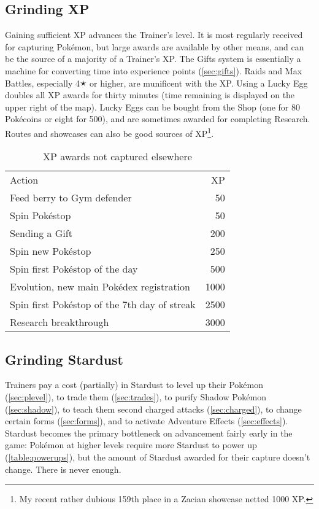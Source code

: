 \subsection{Grinding XP\label{subsec:getxp}}
Gaining sufficient XP advances the Trainer's level.
It is most regularly received for capturing Pokémon, but large awards are
  available by other means, and can be the source of a majority of a Trainer's XP.
The Gifts system is essentially a machine for converting
  time into experience points (\autoref{sec:gifts}).
Raids and Max Battles, especially 4🟉 or higher, are munificent with the XP.
Using a Lucky Egg doubles all XP awards for thirty minutes (time remaining is displayed on the upper right of the map).
Lucky Eggs can be bought from the Shop (one for 80 Pokécoins or eight for 500),
  and are sometimes awarded for completing Research.
Routes and showcases can also be good sources of XP\footnote{My recent rather dubious 159th place in a Zacian showcase netted 1000 XP\@.}.

\begin{table}
\centering
\begin{tabular}{lr}
Action & XP\\
\Midrule
  Feed berry to Gym defender & 50\\
  Spin Pokéstop & 50\\
  Sending a Gift & 200\\
  Spin new Pokéstop & 250\\
  Spin first Pokéstop of the day & 500\\
  Evolution, new main Pokédex registration & 1000\\
  Spin first Pokéstop of the 7th day of streak & 2500\\
  Research breakthrough & 3000\\
\end{tabular}
\caption{XP awards not captured elsewhere\label{table:xpawards}}
\end{table}

\subsection{Grinding Stardust\label{subsec:getdust}}
Trainers pay a cost (partially) in Stardust
  to level up their Pokémon (\autoref{sec:plevel}),
  to trade them (\autoref{sec:trades}),
  to purify Shadow Pokémon (\autoref{sec:shadow}),
  to teach them second charged attacks (\autoref{sec:charged}),
  to change certain forms (\autoref{sec:forms}),
  and to activate Adventure Effects (\autoref{sec:effects}).
Stardust becomes the primary bottleneck on advancement fairly early in the game:
  Pokémon at higher levels require more Stardust to power up (\autoref{table:powerups}),
  but the amount of Stardust awarded for their capture doesn't change.
There is never enough.

